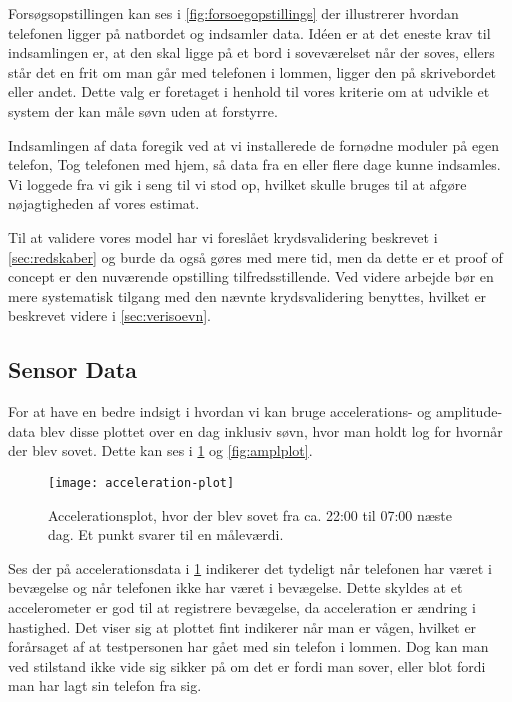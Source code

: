 Forsøgsopstillingen kan ses i \cref{fig:forsoegopstillings} der illustrerer hvordan telefonen ligger på natbordet og indsamler data.
Idéen er at det eneste krav til indsamlingen er, at den skal ligge på et bord i soveværelset når der soves, ellers står det en frit om man går med telefonen i lommen, ligger den på skrivebordet eller andet. 
Dette valg er foretaget i henhold til vores kriterie om at udvikle et system der kan måle søvn uden at forstyrre.

Indsamlingen af data foregik ved at vi installerede de fornødne moduler på egen telefon, Tog telefonen med hjem, så data fra en eller flere dage kunne indsamles.
Vi loggede fra vi gik i seng til vi stod op, hvilket skulle bruges til at afgøre nøjagtigheden af vores estimat.

Til at validere vores model har vi foreslået krydsvalidering beskrevet i \cref{sec:redskaber} og burde da også gøres med mere tid, men da dette er et proof of concept er den nuværende opstilling tilfredsstillende.
Ved videre arbejde bør en mere systematisk tilgang med den nævnte krydsvalidering benyttes, hvilket er beskrevet videre i \cref{sec:verisoevn}.

\subsection{Sensor Data}
For at have en bedre indsigt i hvordan vi kan bruge accelerations- og amplitude-data blev disse plottet over en dag inklusiv søvn, hvor man holdt log for hvornår der blev sovet.
Dette kan ses i \cref{fig:accplot} og \cref{fig:amplplot}.

\begin{figure}[h]
	\centering
	\texttt{[image: acceleration-plot]}
	\caption{Accelerationsplot, hvor der blev sovet fra ca. 22:00 til 07:00 næste dag.  Et punkt svarer til en måleværdi.}\label{fig:accplot}
\end{figure}

Ses der på accelerationsdata i \cref{fig:accplot} indikerer det tydeligt når telefonen har været i bevægelse og når telefonen ikke har været i bevægelse.
Dette skyldes at et accelerometer er god til at registrere bevægelse, da acceleration er ændring i hastighed.
Det viser sig at plottet fint indikerer når man er vågen, hvilket er forårsaget af at testpersonen har gået med sin telefon i lommen.
Dog kan man ved stilstand ikke vide sig sikker på om det er fordi man sover, eller blot fordi man har lagt sin telefon fra sig.

